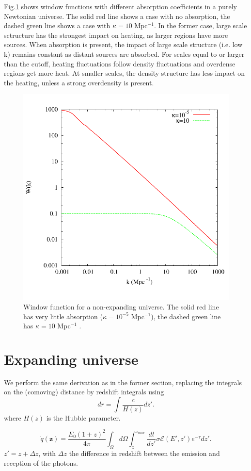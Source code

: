 \documentclass[twocolumns]{emulateapj}
\begin{document}
Fig.\ref{fig:window_newt} shows  window functions with different absorption coefficients in a purely Newtonian universe. The solid red line shows a case with no absorption, the dashed green line shows a case with $\kappa=10$ Mpc$^{-1}$.  In the former case, large scale sctructure has the strongest impact on heating, as larger regions have more sources. When absorption is present,  the impact of large scale structure (i.e. low k) remains constant as distant sources are absorbed. For scales equal to or larger than the cutoff, heating fluctuations follow density fluctuations and overdense regions get more heat. At smaller scales, the density structure has less impact on the heating, unless a strong overdensity is present.  

\begin{figure}
  \centering
  \includegraphics[width = .45\textwidth ]{newtonian_window-eps-converted-to}
  \caption{Window function for a non-expanding universe. The solid red line has very little absorption ($\kappa=10^{-5}$ Mpc$^{-1}$), the dashed green line has $\kappa=10 $ Mpc$^{-1}$ .}
  \label{fig:window_newt}
\end{figure}



\section{Expanding universe}\label{sec:window_exp}

We perform the same derivation as in the former section, replacing the integrals on the (comoving) distance by redshift integrals using
\begin{equation}
  \label{eq:proper_dist}
  dr=\int \frac{c}{H(z)} dz'.
\end{equation}
where  $H(z)$ is the Hubble parameter.


\begin{equation}
  \label{eq:int_exp_heat}
  \dot{q}(\mathbf{z})=\frac{E_0(1+z)^2}{4\pi}\int_{\Omega}d\Omega\int_z^{z_{max}}\frac{dl}{dz'}\sigma\mathcal{E}(E',z') e^{-\tau} dz'.
\end{equation}
 $z'=z+\Delta z$, with $\Delta z$ the difference in redshift between the emission and reception of the photons.
\end{document}
